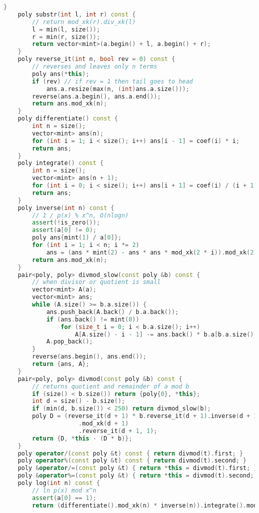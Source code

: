 \documentclass[10pt, a4paper, oneside]{book}
\begin{document}
\begin{lstlisting}[language=C++]
    }
    poly substr(int l, int r) const {
        // return mod_xk(r).div_xk(l)
        l = min(l, size());
        r = min(r, size());
        return vector<mint>(a.begin() + l, a.begin() + r);
    }
    poly reverse_it(int n, bool rev = 0) const {
        // reverses and leaves only n terms
        poly ans(*this);
        if (rev) // if rev = 1 then tail goes to head
            ans.a.resize(max(n, (int)ans.a.size()));
        reverse(ans.a.begin(), ans.a.end());
        return ans.mod_xk(n);
    }
    poly differentiate() const {
        int n = size();
        vector<mint> ans(n);
        for (int i = 1; i < size(); i++) ans[i - 1] = coef(i) * i;
        return ans;
    }
    poly integrate() const {
        int n = size();
        vector<mint> ans(n + 1);
        for (int i = 0; i < size(); i++) ans[i + 1] = coef(i) / (i + 1);
        return ans;
    }
    poly inverse(int n) const {
        // 1 / p(x) % x^n, O(nlogn)
        assert(!is_zero());
        assert(a[0] != 0);
        poly ans{mint(1) / a[0]};
        for (int i = 1; i < n; i *= 2)
            ans = (ans * mint(2) - ans * ans * mod_xk(2 * i)).mod_xk(2 * i);
        return ans.mod_xk(n);
    }
    pair<poly, poly> divmod_slow(const poly &b) const {
        // when divisor or quotient is small
        vector<mint> A(a);
        vector<mint> ans;
        while (A.size() >= b.a.size()) {
            ans.push_back(A.back() / b.a.back());
            if (ans.back() != mint(0))
                for (size_t i = 0; i < b.a.size(); i++)
                    A[A.size() - i - 1] -= ans.back() * b.a[b.a.size() - i - 1];
            A.pop_back();
        }
        reverse(ans.begin(), ans.end());
        return {ans, A};
    }
    pair<poly, poly> divmod(const poly &b) const {
        // returns quotient and remainder of a mod b
        if (size() < b.size()) return {poly{0}, *this};
        int d = size() - b.size();
        if (min(d, b.size()) < 250) return divmod_slow(b);
        poly D = (reverse_it(d + 1) * b.reverse_it(d + 1).inverse(d + 1))
                     .mod_xk(d + 1)
                     .reverse_it(d + 1, 1);
        return {D, *this - (D * b)};
    }
    poly operator/(const poly &t) const { return divmod(t).first; }
    poly operator%(const poly &t) const { return divmod(t).second; }
    poly &operator/=(const poly &t) { return *this = divmod(t).first; }
    poly &operator%=(const poly &t) { return *this = divmod(t).second; }
    poly log(int n) const {
        // ln p(x) mod x^n
        assert(a[0] == 1);
        return (differentiate().mod_xk(n) * inverse(n)).integrate().mod_xk(n);

\end{lstlisting}
\end{document}
